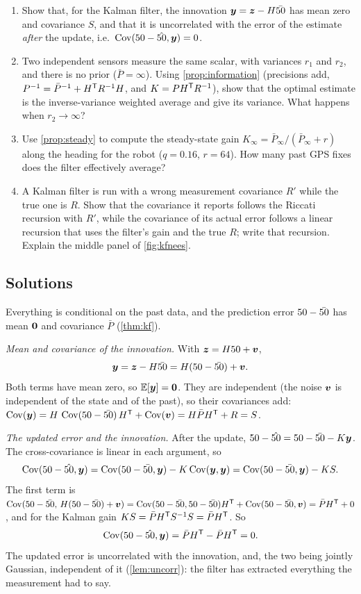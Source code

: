 \begin{enumerate}[label=\textbf{3.\arabic*},ref=3.\arabic*]
\item\label{ex:innov} Show that, for the Kalman filter, the innovation
  $\bm{y}=\bm{z}-H\bar{50}$ has mean zero and covariance $S$, and that it is
  uncorrelated with the error of the estimate \emph{after} the update,
  i.e.\ $\operatorname{Cov}(50-\hat{50},\bm{y})=0$.
\item\label{ex:fusion} Two independent sensors measure the same scalar,
  with variances $r_1$ and $r_2$, and there is no prior ($\bar P=\infty$).
  Using \cref{prop:information} (precisions add,
$P^{-1}=\bar P^{-1}+H^{\mathsf{T}} R^{-1}H$, and $K=PH^{\mathsf{T}} R^{-1}$), show that the
optimal estimate is the
  inverse-variance weighted average and give its variance. What happens
  when $r_2\to\infty$?
\item\label{ex:steadynum} Use \cref{prop:steady} to compute the
  steady-state gain $K_\infty=\bar P_\infty/(\bar P_\infty+r)$ along the
  heading for the robot ($q=0.16$, $r=64$). How many past GPS fixes does
  the filter effectively average?
\item\label{ex:wrongR} A Kalman filter is run with a wrong measurement
  covariance $R'$ while the true one is $R$. Show that the covariance it
  reports follows the Riccati recursion with $R'$, while the covariance of
  its actual error follows a linear recursion that uses the filter's gain
  and the true $R$; write that recursion. Explain the middle panel of
  \cref{fig:kfnees}.
\end{enumerate}

\subsection*{Solutions}

 Everything is conditional on the past data, and the
prediction error $50-\bar{50}$ has mean $\bm{0}$ and covariance $\bar P$
(\cref{thm:kf}).

\emph{Mean and covariance of the innovation.} With $\bm{z}=H50+\bm{v}$,
\[
  \bm{y}=\bm{z}-H\bar{50}=H(50-\bar{50})+\bm{v} .
\]
Both terms have mean zero, so $\mathbb{E}[\bm{y}]=\bm{0}$. They are independent (the
noise $\bm{v}$ is independent of the state and of the past), so their
covariances add:
$\operatorname{Cov}(\bm{y})=H\,\operatorname{Cov}(50-\bar{50})\,H^{\mathsf{T}}+\operatorname{Cov}(\bm{v})=H\bar PH^{\mathsf{T}}+R=S$.

\emph{The updated error and the innovation.} After the update,
$50-\hat{50}=50-\bar{50}-K\bm{y}$. The cross-covariance is linear in each argument, so
\[
  \operatorname{Cov}(50-\hat{50},\bm{y})=\operatorname{Cov}(50-\bar{50},\bm{y})-K\operatorname{Cov}(\bm{y},\bm{y})=\operatorname{Cov}(50-\bar{50},\bm{y})-KS .
\]
The first term is
$\operatorname{Cov}(50-\bar{50},\,H(50-\bar{50})+\bm{v})=\operatorname{Cov}(50-\bar{50},50-\bar{50})H^{\mathsf{T}}+\operatorname{Cov}(50-\bar{50},\bm{v})
=\bar PH^{\mathsf{T}}+0$, and for the Kalman gain $KS=\bar PH^{\mathsf{T}} S^{-1}S=\bar PH^{\mathsf{T}}$.
So
\[
  \operatorname{Cov}(50-\hat{50},\bm{y})=\bar PH^{\mathsf{T}}-\bar PH^{\mathsf{T}}=0 .
\]
The updated error is uncorrelated with the innovation, and, the two being
jointly Gaussian, independent of it (\cref{lem:uncorr}): the filter has
extracted everything the measurement had to say.

